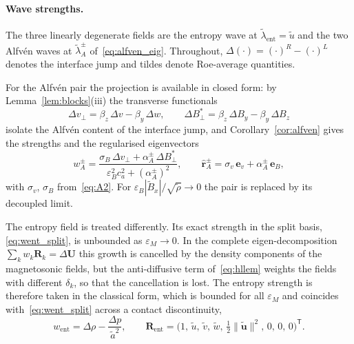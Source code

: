 \documentclass[a4paper,fleqn]{cas-sc}
\theoremstyle{remark}
\newcommand{\eps}{\varepsilon}
\newcommand{\epsM}{\eps_{M}}
\newcommand{\epsB}{\eps_{B}}
\newcommand{\RR}{\mathbf{R}}
\newcommand{\half}{\tfrac{1}{2}}
\begin{document}
\paragraph{Wave strengths.}
The three linearly degenerate fields are the entropy wave at
$\tilde\lambda_{\mathrm{ent}}=\tilde u$ and the two Alfv\'en waves at
$\tilde\lambda_A^{\pm}$ of~\eqref{eq:alfven_eig}. Throughout,
$\Delta(\cdot)=(\cdot)^{R}-(\cdot)^{L}$ denotes the interface jump and tildes
denote Roe-average quantities.

For the Alfv\'en pair the projection is available in closed form: by
Lemma~\ref{lem:blocks}(iii) the transverse functionals
\begin{equation}
\label{eq:alf_jumps}
\Delta v_\perp=\beta_z\,\Delta v-\beta_y\,\Delta w,
\qquad
\Delta B_\perp^{*}=\beta_z\,\Delta B_y-\beta_y\,\Delta B_z
\end{equation}
isolate the Alfv\'en content of the interface jump, and
Corollary~\ref{cor:alfven} gives the strengths and the regularised
eigenvectors
\begin{equation}
\label{eq:walf}
w_A^{\pm}=\frac{\sigma_B\,\Delta v_\perp+\alpha_A^{\pm}\,\Delta B_\perp^{*}}
{\epsB^{2}c_a^{2}+(\alpha_A^{\pm})^{2}},
\qquad
\hat{\mathbf r}_A^{\pm}=\sigma_v\,\mathbf e_v+\alpha_A^{\pm}\,\mathbf e_B,
\end{equation}
with $\sigma_v$, $\sigma_B$ from~\eqref{eq:A2}. For
$\epsB|\tilde B_x|/\sqrt{\tilde\rho}\to0$ the pair is replaced by its
decoupled limit.

The entropy field is treated differently. Its exact strength in the split
basis, \eqref{eq:went_split}, is unbounded as $\epsM\to0$. In the complete
eigen-decomposition $\sum_kw_k\RR_k=\Delta\mathbf U$ this growth is cancelled
by the density components of the magnetosonic fields, but the anti-diffusive
term of~\eqref{eq:hllem} weights the fields with different $\delta_k$, so
that the cancellation is lost. The entropy strength is therefore taken in the
classical form, which is bounded for all $\epsM$ and coincides
with~\eqref{eq:went_split} across a contact discontinuity,
\begin{equation}
\label{eq:went}
w_{\mathrm{ent}}=\Delta\rho-\frac{\Delta p}{\tilde a^{2}},
\qquad
\RR_{\mathrm{ent}}=\bigl(1,\,\tilde u,\,\tilde v,\,\tilde w,\,
\half\|\tilde{\mathbf u}\|^{2},\,0,\,0,\,0\bigr)^{\mathsf T}.
\end{equation}
\end{document}

